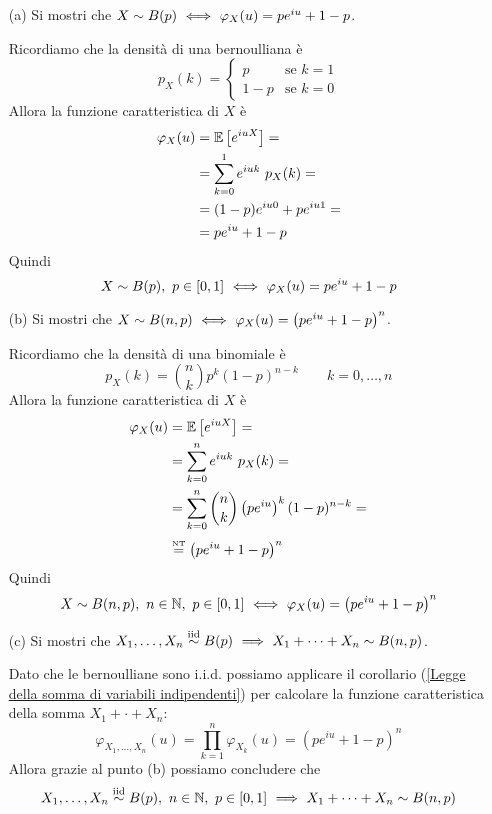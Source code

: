 \Soluzione{} %
\begin{enumerate}
\item [(a)] Si mostri che $X\sim B(p)\ \Longleftrightarrow\ \varphi_X(u)=pe^{iu}+1-p$.

Ricordiamo che la densità di una bernoulliana è
\[
p_X(k)=\begin{cases} p&\text{se }k=1 \\ 1-p &\text{se }k=0 \end{cases}
\]
Allora la funzione caratteristica di $X$ è
\begin{gather*}
\begin{aligned}
\varphi_X(u)&=\mathbb{E}\left[e^{iuX}  \right]=\\
&=\sum_{k=0}^1e^{iuk}\ p_X(k)=\\
&=(1-p)e^{iu0}+pe^{iu1}=\\
&=pe^{iu}+1-p
\end{aligned}
\end{gather*}
Quindi
\[
X\sim B(p),\ p\in[0,1]\SESOLOSE\varphi_X(u)=pe^{iu}+1-p
\]

\item [(b)] Si mostri che $X\sim B(n,p)\ \Longleftrightarrow\ \varphi_X(u)=\left(pe^{iu}+1-p  \right)^n$.

Ricordiamo che la densità di una binomiale è
\[
p_X(k)=\binom{n}{k}p^k(1-p)^{n-k}\qquad k=0,\dots,n
\]
Allora la funzione caratteristica di $X$ è
\begin{gather*}
\begin{aligned}
\varphi_X(u)&=\mathbb{E}\left[e^{iuX}  \right]=\\
&=\sum_{k=0}^ne^{iuk}\ p_X(k)=\\
&=\sum_{k=0}^n\binom{n}{k}\left(pe^{iu}\right)^k(1-p)^{n-k}=\\
&\overset{\underset{\text{NT}}{}}{=}\left(pe^{iu}+1-p\right)^n
\end{aligned}
\end{gather*}
Quindi
\[
X\sim B(n,p),\ n\in\NN,\ p\in[0,1]\SESOLOSE\varphi_X(u)=\left(pe^{iu}+1-p\right)^n
\]

\item [(c)] Si mostri che $X_1,\dots,X_n\stackrel{\mathrm{iid}}{\sim} B(p)\ \Longrightarrow\  X_1+\cdots+X_n\sim B(n,p)$.

Dato che le bernoulliane sono i.i.d. possiamo applicare il corollario (\ref{Legge della somma di variabili indipendenti}) per calcolare la funzione caratteristica della somma $X_1+\cdot+X_n$:
\[
\varphi_{X_1,\dots,X_n}(u)=\prod_{k=1}^n\varphi_{X_k}(u)=\left(pe^{iu}+1-p\right)^n
\]
Allora grazie al punto (b) possiamo concludere che 
\[
X_1,\dots,X_n\stackrel{\mathrm{iid}}{\sim} B(p),\ n\in\mathbb{N},\ p\in[0,1] \ \Longrightarrow\  X_1+\cdots+X_n\sim B(n,p)
\]


\end{enumerate}
